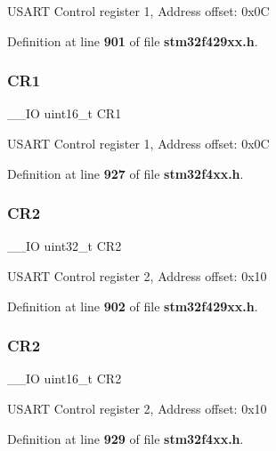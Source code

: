 U\+S\+A\+RT Control register 1, Address offset\+: 0x0C 

Definition at line \textbf{ 901} of file \textbf{ stm32f429xx.\+h}.

\mbox{\label{structUSART__TypeDef_a61400ce239355b62aa25c95fcc18a5e1}} 
\subsubsection{C\+R1\hspace{0.1cm}{\footnotesize\ttfamily [2/2]}}
{\footnotesize\ttfamily \+\_\+\+\_\+\+IO uint16\+\_\+t C\+R1}

U\+S\+A\+RT Control register 1, Address offset\+: 0x0C 

Definition at line \textbf{ 927} of file \textbf{ stm32f4xx.\+h}.

\mbox{\label{structUSART__TypeDef_afdfa307571967afb1d97943e982b6586}} 
\subsubsection{C\+R2\hspace{0.1cm}{\footnotesize\ttfamily [1/2]}}
{\footnotesize\ttfamily \+\_\+\+\_\+\+IO uint32\+\_\+t C\+R2}

U\+S\+A\+RT Control register 2, Address offset\+: 0x10 

Definition at line \textbf{ 902} of file \textbf{ stm32f429xx.\+h}.

\mbox{\label{structUSART__TypeDef_a2a3e81bd118d1bc52d24a0b0772e6a0c}} 
\subsubsection{C\+R2\hspace{0.1cm}{\footnotesize\ttfamily [2/2]}}
{\footnotesize\ttfamily \+\_\+\+\_\+\+IO uint16\+\_\+t C\+R2}

U\+S\+A\+RT Control register 2, Address offset\+: 0x10 

Definition at line \textbf{ 929} of file \textbf{ stm32f4xx.\+h}.

